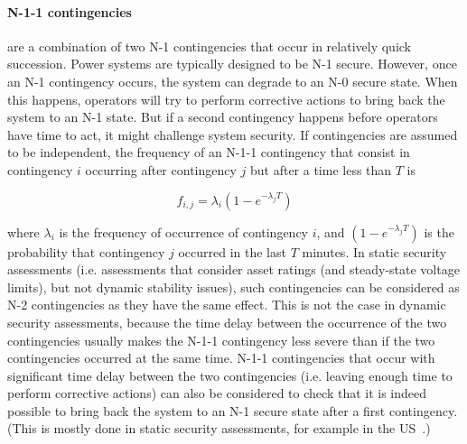 \paragraph*{N-1-1 contingencies} are a combination of two N-1 contingencies that occur in relatively quick succession. Power systems are typically designed to be N-1 secure. However, once an N-1 contingency occurs, the system can degrade to an N-0 secure state. When this happens, operators will try to perform corrective actions to bring back the system to an N-1 state. But if a second contingency happens before operators have time to act, it might challenge system security. If contingencies are assumed to be independent, the frequency of an N-1-1 contingency that consist in contingency \(i\) occurring after contingency \(j\) but after a time less than \(T\) is

\begin{equation}
\label{eq:N-1-1_frequency}
    f_{i,j} = \lambda_i  (1-e^{-\lambda_j T})
\end{equation}

\noindent where \(\lambda_i\) is the frequency of occurrence of contingency \(i\), and \((1-e^{-\lambda_j T})\) is the probability that contingency \(j\) occurred in the last \(T\) minutes. In static security assessments (i.e. assessments that consider asset ratings (and steady-state voltage limits), but not dynamic stability issues), such contingencies can be considered as N-2 contingencies as they have the same effect. This is not the case in dynamic security assessments, because the time delay between the occurrence of the two contingencies usually makes the N-1-1 contingency less severe than if the two contingencies occurred at the same time. N-1-1 contingencies that occur with significant time delay between the two contingencies (i.e. leaving enough time to perform corrective actions) can also be considered to check that it is indeed possible to bring back the system to an N-1 secure state after a first contingency. (This is mostly done in static security assessments, for example in the US~\cite{ContingencyTypes}.)

